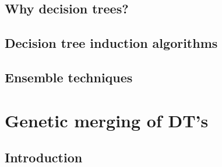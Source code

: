 \documentclass[english]{beamer}
\begin{document}
\subsection*{Why decision trees?}

\subsection*{Decision tree induction algorithms}

\subsection*{Ensemble techniques}

\section{Genetic merging of DT's}
\subsection*{Introduction}
\end{document}
